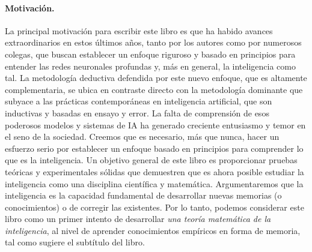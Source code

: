 \documentclass[../../book-main.tex]{subfiles}
\begin{document}
\paragraph{Motivación.}
La principal motivación para escribir este libro es que ha habido
avances extraordinarios en estos últimos años, tanto por los autores como por
numerosos colegas, que buscan establecer un enfoque riguroso y basado en
principios para entender las redes neuronales profundas y, más en general, la
inteligencia como tal. La metodología deductiva defendida por este nuevo 
enfoque, que es altamente complementaria, se ubica en contraste directo con la 
metodología dominante que subyace a las prácticas contemporáneas en inteligencia 
artificial, que son inductivas y basadas en ensayo y error. La falta de comprensión
de esos poderosos modelos y sistemas de IA ha generado creciente
entusiasmo y temor en el seno de la sociedad. Creemos que es necesario, más 
que nunca, hacer un esfuerzo serio por establecer un enfoque basado en principios 
para comprender lo que es la inteligencia. Un objetivo general de este libro es 
proporcionar pruebas teóricas y experimentales sólidas que demuestren que es ahora
posible estudiar la inteligencia como una disciplina científica y matemática. Argumentaremos
que la inteligencia es la capacidad fundamental de desarrollar nuevas memorias (o
conocimientos) o de corregir las existentes. Por lo tanto, podemos considerar este
libro como un primer intento de desarrollar {\em una teoría matemática de la 
inteligencia}, al nivel de aprender conocimientos empíricos en forma de memoria, 
tal como sugiere el subtítulo del libro.
\end{document}
